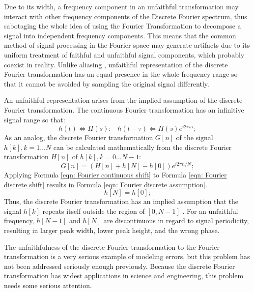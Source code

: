 \documentclass[twoside]{article}
\numberwithin{equation}{section}
\newcommand{\eqspace}{\;\;\;}
\begin{document}
Due to its width, a frequency component in an unfaithful transformation may interact with other frequency components of the Discrete Fourier spectrum, thus sabotaging the whole idea of using the Fourier Transformation to decompose a signal into independent frequency components.  
This means that the common method of signal processing in the Fourier space \cite{Numerical_Recipes}\cite{Stochastic_Arithmetic}\cite{Floating-point_Digital_Filters} may generate artifacts due to its uniform treatment of faithful and unfaithful signal components, which probably coexist in reality.  
Unlike aliasing \cite{Electronics}\cite{Numerical_Recipes}\cite{Floating-point_Digital_Filters}, unfaithful representation of the discrete Fourier transformation has an equal presence in the whole frequency range so that it cannot be avoided by sampling the original signal differently.

An unfaithful representation arises from the implied assumption of the discrete Fourier transformation.  
The continuous Fourier transformation has an infinitive signal range so that:
\begin{equation}
\label{eqn: Fourier continuous shift}
h(t) \Leftrightarrow H(s): \eqspace h(t - \tau) \Leftrightarrow H(s) e^{i 2\pi s \tau};
\end{equation}
As an analog, the discrete Fourier transformation $G[n]$ of the signal $h[k], k = 1 \dots N$ can be calculated mathematically from the discrete Fourier transformation $H[n]$ of $h[k], k = 0\dots N-1$:
\begin{equation}
\label{eqn: Fourier discrete shift}
G[n] = (H[n] + h[N] - h[0]) e^{i 2\pi n/N};
\end{equation}
Applying Formula \eqref{eqn: Fourier continuous shift} to Formula \eqref{eqn: Fourier discrete shift} results in Formula \eqref{eqn: Fourier discrete assumption}.
\begin{equation}
\label{eqn: Fourier discrete assumption}
h[N] = h[0];
\end{equation}
Thus, the discrete Fourier transformation has an implied assumption that the signal $h[k]$ repeats itself outside the region of $[0, N-1]$ \cite{Numerical_DFT}.  
For an unfaithful frequency, $h[N-1]$ and $h[N]$ are discontinuous in regard to signal periodicity, resulting in larger peak width, lower peak height, and the wrong phase.  

The unfaithfulness of the discrete Fourier transformation to the Fourier transformation is a very serious example of modeling errors, but this problem has not been addressed seriously enough previously.
Because the discrete Fourier transformation has widest applications in science and engineering, this problem needs some serious attention.
\end{document}
